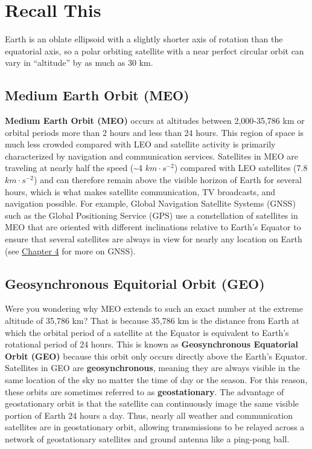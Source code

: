 \documentclass[
]{book}
\begin{document}
\hypertarget{recall-this-3}{%
\section*{Recall This}\label{recall-this-3}}

Earth is an oblate ellipsoid with a slightly shorter axis of rotation than the equatorial axis, so a polar orbiting satellite with a near perfect circular orbit can vary in ``altitude'' by as much as 30 km.

\hypertarget{medium-earth-orbit-meo}{%
\subsection{Medium Earth Orbit (MEO)}\label{medium-earth-orbit-meo}}

\textbf{Medium Earth Orbit (MEO)} occurs at altitudes between 2,000-35,786 km or orbital periods more than 2 hours and less than 24 hours. This region of space is much less crowded compared with LEO and satellite activity is primarily characterized by navigation and communication services. Satellites in MEO are traveling at nearly half the speed (\textasciitilde4 \(km·s^{-2}\)) compared with LEO satellites (7.8 \(km·s^{-2}\)) and can therefore remain above the visible horizon of Earth for several hours, which is what makes satellite communication, TV broadcasts, and navigation possible. For example, Global Navigation Satellite Systems (GNSS) such as the Global Positioning Service (GPS) use a constellation of satellites in MEO that are oriented with different inclinations relative to Earth's Equator to ensure that several satellites are always in view for nearly any location on Earth (see \href{https://ubc-geomatics-textbook.github.io/geomatics-textbook/collecting-and-editing-data.html}{Chapter 4} for more on GNSS).

\hypertarget{geosynchronous-equitorial-orbit-geo}{%
\subsection{Geosynchronous Equitorial Orbit (GEO)}\label{geosynchronous-equitorial-orbit-geo}}

Were you wondering why MEO extends to such an exact number at the extreme altitude of 35,786 km? That is because 35,786 km is the distance from Earth at which the orbital period of a satellite at the Equator is equivalent to Earth's rotational period of 24 hours. This is known as \textbf{Geosynchronous Equatorial Orbit (GEO)} because this orbit only occurs directly above the Earth's Equator. Satellites in GEO are \textbf{geosynchronous}, meaning they are always visible in the same location of the sky no matter the time of day or the season. For this reason, these orbits are sometimes referred to as \textbf{geostationary}. The advantage of geostationary orbit is that the satellite can continuously image the same visible portion of Earth 24 hours a day. Thus, nearly all weather and communication satellites are in geostationary orbit, allowing transmissions to be relayed across a network of geostationary satellites and ground antenna like a ping-pong ball.
\end{document}
